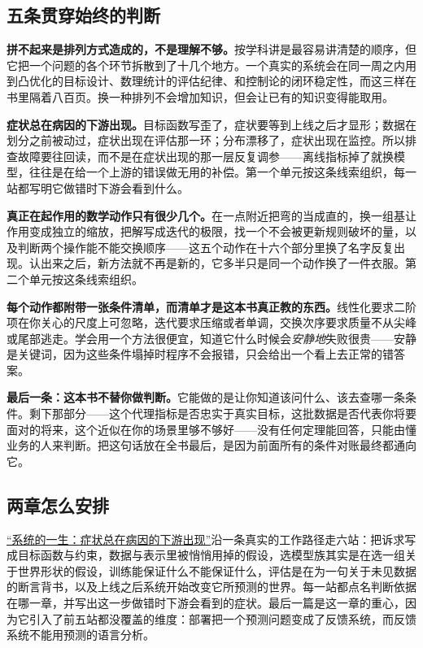 \subsection{五条贯穿始终的判断}

\textbf{拼不起来是排列方式造成的，不是理解不够。}按学科讲是最容易讲清楚的顺序，但它把一个问题的各个环节拆散到了十几个地方。一个真实的系统会在同一周之内用到凸优化的目标设计、数理统计的评估纪律、和控制论的闭环稳定性，而这三样在书里隔着八百页。换一种排列不会增加知识，但会让已有的知识变得能取用。

\textbf{症状总在病因的下游出现。}目标函数写歪了，症状要等到上线之后才显形；数据在划分之前被动过，症状出现在评估那一环；分布漂移了，症状出现在监控。所以排查故障要往回读，而不是在症状出现的那一层反复调参——离线指标掉了就换模型，往往是在给一个上游的错误做无用的补偿。第一个单元按这条线索组织，每一站都写明它做错时下游会看到什么。

\textbf{真正在起作用的数学动作只有很少几个。}在一点附近把弯的当成直的，换一组基让作用变成独立的缩放，把解写成迭代的极限，找一个不会被更新规则破坏的量，以及判断两个操作能不能交换顺序——这五个动作在十六个部分里换了名字反复出现。认出来之后，新方法就不再是新的，它多半只是同一个动作换了一件衣服。第二个单元按这条线索组织。

\textbf{每个动作都附带一张条件清单，而清单才是这本书真正教的东西。}线性化要求二阶项在你关心的尺度上可忽略，迭代要求压缩或者单调，交换次序要求质量不从尖峰或尾部逃走。学会用一个方法很便宜，知道它什么时候会\emph{安静地}失败很贵——安静是关键词，因为这些条件塌掉时程序不会报错，只会给出一个看上去正常的错答案。

\textbf{最后一条：这本书不替你做判断。}它能做的是让你知道该问什么、该去查哪一条条件。剩下那部分——这个代理指标是否忠实于真实目标，这批数据是否代表你将要面对的将来，这个近似在你的场景里够不够好——没有任何定理能回答，只能由懂业务的人来判断。把这句话放在全书最后，是因为前面所有的条件对账最终都通向它。

\subsection{两章怎么安排}

\hyperref[ch:148]{``系统的一生：症状总在病因的下游出现''}沿一条真实的工作路径走六站：把诉求写成目标函数与约束，数据与表示里被悄悄用掉的假设，选模型族其实是在选一组关于世界形状的假设，训练能保证什么不能保证什么，评估是在为一句关于未见数据的断言背书，以及上线之后系统开始改变它所预测的世界。每一站都点名判断依据在哪一章，并写出这一步做错时下游会看到的症状。最后一篇是这一章的重心，因为它引入了前五站都没覆盖的维度：部署把一个预测问题变成了反馈系统，而反馈系统不能用预测的语言分析。

